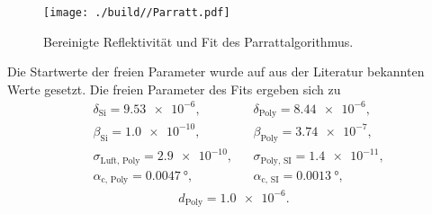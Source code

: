 \begin{figure}[H]
    \centering
    \texttt{[image: ./build//Parratt.pdf]}
    \caption{Bereinigte Reflektivität und Fit des Parrattalgorithmus.}
    \label{fig:Reflectivity3}
\end{figure}
\noindent
Die Startwerte der freien Parameter wurde auf aus der Literatur bekannten Werte gesetzt.
Die freien Parameter des Fits ergeben sich zu
\begin{align*}
    &\delta_{\text{Si}} = \SI{9.53e-6}, & & \delta_{\text{Poly}} = \SI{8.44e-6}, \\
    &\beta_{\text{Si}} = \SI{1.0e-10}, & &\beta_{\text{Poly}} = \SI{3.74e-7}, \\
    &\sigma_{\text{Luft, Poly}} = \SI{2.9e-10}, & & \sigma_{\text{Poly, SI}} = \SI{1.4e-11}, \\
    &\alpha_{\text{c, Poly}} = \SI{0.0047}{\degree}, & & \alpha_{\text{c, SI}} = \SI{0.0013}{\degree}, 
\end{align*}
\begin{align*}
    d_{\text{Poly}} = \SI{1.0e-6}.
\end{align*}